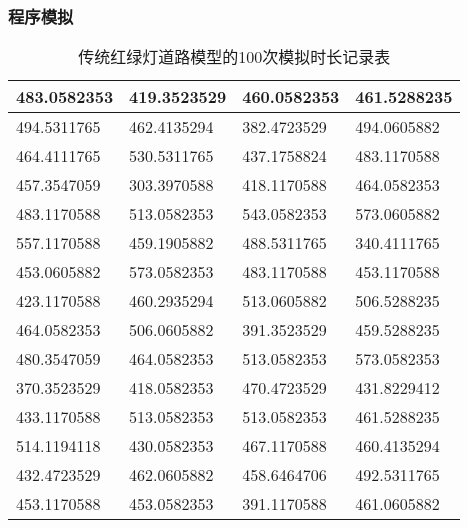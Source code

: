\documentclass[a4paper,12pt]{article}
\numberwithin{equation}{section}
\begin{document}
%		
\subsubsection{程序模拟}
\begin{table}[H]
	\centering
	\caption{传统红绿灯道路模型的100次模拟时长记录表}
	\begin{tabular}{|l|l|l|l|}
		\hline
		483.0582353 & 419.3523529 & 460.0582353 & 461.5288235 \\ \hline
		494.5311765 & 462.4135294 & 382.4723529 & 494.0605882 \\ \hline
		464.4111765 & 530.5311765 & 437.1758824 & 483.1170588 \\ \hline
		457.3547059 & 303.3970588 & 418.1170588 & 464.0582353 \\ \hline
		483.1170588 & 513.0582353 & 543.0582353 & 573.0605882 \\ \hline
		557.1170588 & 459.1905882 & 488.5311765 & 340.4111765 \\ \hline
		453.0605882 & 573.0582353 & 483.1170588 & 453.1170588 \\ \hline
		423.1170588 & 460.2935294 & 513.0605882 & 506.5288235 \\ \hline
		464.0582353 & 506.0605882 & 391.3523529 & 459.5288235 \\ \hline
		480.3547059 & 464.0582353 & 513.0582353 & 573.0582353 \\ \hline
		370.3523529 & 418.0582353 & 470.4723529 & 431.8229412 \\ \hline
		433.1170588 & 513.0582353 & 513.0582353 & 461.5288235 \\ \hline
		514.1194118 & 430.0582353 & 467.1170588 & 460.4135294 \\ \hline
		432.4723529 & 462.0605882 & 458.6464706 & 492.5311765 \\ \hline
		453.1170588 & 453.0582353 & 391.1170588 & 461.0605882 \\ \hline

\end{tabular}
\end{table}
\end{document}
